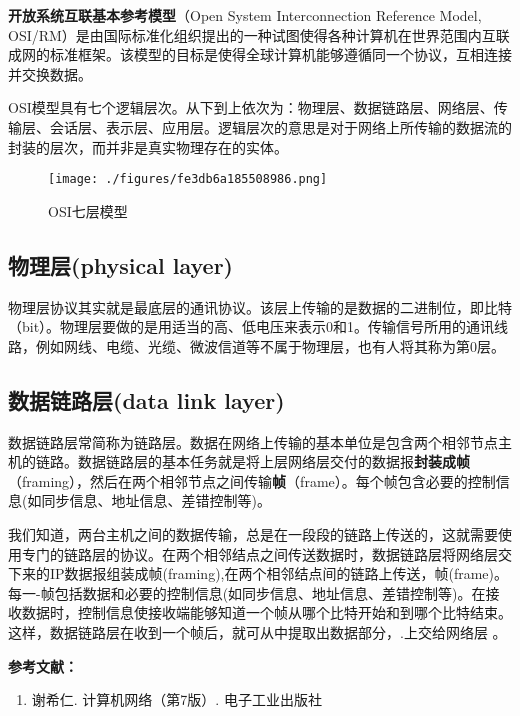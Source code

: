 
\textbf{开放系统互联基本参考模型}（Open System Interconnection Reference Model, OSI/RM）是由国际标准化组织提出的一种试图使得各种计算机在世界范围内互联成网的标准框架。该模型的目标是使得全球计算机能够遵循同一个协议，互相连接并交换数据。

OSI模型具有七个逻辑层次。从下到上依次为：物理层、数据链路层、网络层、传输层、会话层、表示层、应用层。逻辑层次的意思是对于网络上所传输的数据流的封装的层次，而并非是真实物理存在的实体。
\begin{figure}[ht]
\centering
\texttt{[image: ./figures/fe3db6a185508986.png]}
\caption{OSI七层模型} \label{fig_OSIRM_1}
\end{figure}

\subsection{物理层(physical layer)}

物理层协议其实就是最底层的通讯协议。该层上传输的是数据的二进制位，即比特（bit）。物理层要做的是用适当的高、低电压来表示0和1。传输信号所用的通讯线路，例如网线、电缆、光缆、微波信道等不属于物理层，也有人将其称为第0层。

\subsection{数据链路层(data link layer)}

数据链路层常简称为链路层。数据在网络上传输的基本单位是包含两个相邻节点主机的链路。数据链路层的基本任务就是将上层网络层交付的数据报\textbf{封装成帧}（framing），然后在两个相邻节点之间传输\textbf{帧}（frame）。每个帧包含必要的控制信息(如同步信息、地址信息、差错控制等)。

我们知道，两台主机之间的数据传输，总是在一段段的链路上传送的，这就需要使用专门的链路层的协议。在两个相邻结点之间传送数据时，数据链路层将网络层交下来的IP数据报组装成帧(framing),在两个相邻结点间的链路上传送，帧(frame)。每一-帧包括数据和必要的控制信息(如同步信息、地址信息、差错控制等)。在接收数据时，控制信息使接收端能够知道一个帧从哪个比特开始和到哪个比特结束。这样，数据链路层在收到一个帧后，就可从中提取出数据部分，.上交给网络层 。


\textbf{参考文献：}
\begin{enumerate}
\item 谢希仁. 计算机网络（第7版）. 电子工业出版社
\end{enumerate}